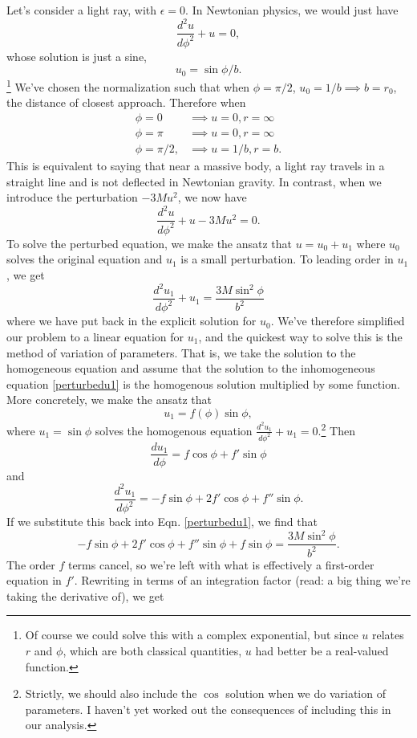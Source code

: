 Let's consider a light ray, with $\epsilon=0$. In Newtonian physics, we would just have
$$\frac{d^2u}{d\phi^2}+u=0,$$ whose solution is just a sine, $$u_0=\sin\phi/b.$$\footnote{Of course we could solve this with a complex exponential, but since $u$ relates $r$ and $\phi$, which are both classical quantities, $u$ had better be a real-valued function.} We've chosen the normalization such that when $\phi=\pi/2$, $u_0=1/b\implies b=r_0$, the distance of closest approach. Therefore when
\begin{align*}
    \phi=0 &\implies u=0,r=\infty\\
    \phi=\pi &\implies u=0, r=\infty\\
    \phi=\pi/2, &\implies u=1/b, r=b.
\end{align*}
This is equivalent to saying that near a massive body, a light ray travels in a straight line and is not deflected in Newtonian gravity. In contrast, when we introduce the perturbation $-3Mu^2$, we now have
\begin{equation}
\frac{d^2u}{d\phi^2}+u-3Mu^2=0.
\end{equation}
To solve the perturbed equation, we make the ansatz that $u=u_0+u_1$ where $u_0$ solves the original equation and $u_1$ is a small perturbation. To leading order in $u_1$, we get
\begin{equation}\label{perturbedu1}
\frac{d^2u_1}{d\phi^2}+u_1=\frac{3M\sin^2\phi}{b^2}
\end{equation}
where we have put back in the explicit solution for $u_0$.
We've therefore simplified our problem to a linear equation for $u_1$, and the quickest way to solve this is the method of variation of parameters. That is, we take the solution to the homogeneous equation and assume that the solution to the inhomogeneous equation \ref{perturbedu1} is the homogenous solution multiplied by some function. More concretely, we make the ansatz that $$u_1=f(\phi)\sin\phi,$$ where $u_1=\sin\phi$ solves the homogenous equation $\frac{d^2u_1}{d\phi^2}+u_1=0$.\footnote{Strictly, we should also include the $\cos$ solution when we do variation of parameters. I haven't yet worked out the consequences of including this in our analysis.} Then
$$\frac{du_1}{d\phi}=f\cos\phi+f' \sin\phi$$
and
$$\frac{d^2u_1}{d\phi^2}=-f\sin\phi+2f' \cos\phi+f''\sin\phi.$$
If we substitute this back into Eqn. \ref{perturbedu1}, we find that
$$-f\sin\phi+2f'\cos\phi+f''\sin\phi+f\sin\phi=\frac{3M\sin^2\phi}{b^2}.$$
The order $f$ terms cancel, so we're left with what is effectively a first-order equation in $f'$. Rewriting in terms of an integration factor (read: a big thing we're taking the derivative of), we get
